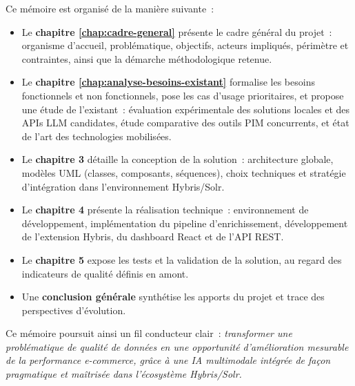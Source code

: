 Ce mémoire est organisé de la manière suivante~:

\begin{itemize}
  \item Le \textbf{chapitre \ref{chap:cadre-general}} présente le cadre général du projet~: organisme d'accueil, problématique, objectifs, acteurs impliqués, périmètre et contraintes, ainsi que la démarche méthodologique retenue.

  \item Le \textbf{chapitre \ref{chap:analyse-besoins-existant}} formalise les besoins fonctionnels et non fonctionnels, pose les cas d'usage prioritaires, et propose une étude de l'existant~: évaluation expérimentale des solutions locales et des APIs LLM candidates, étude comparative des outils PIM concurrents, et état de l'art des technologies mobilisées.

  \item Le \textbf{chapitre 3} détaille la conception de la solution~: architecture globale, modèles UML (classes, composants, séquences), choix techniques et stratégie d'intégration dans l'environnement Hybris/Solr.

  \item Le \textbf{chapitre 4} présente la réalisation technique~: environnement de développement, implémentation du pipeline d'enrichissement, développement de l'extension Hybris, du dashboard React et de l'API REST.

  \item Le \textbf{chapitre 5} expose les tests et la validation de la solution, au regard des indicateurs de qualité définis en amont.

  \item Une \textbf{conclusion générale} synthétise les apports du projet et trace des perspectives d'évolution.
\end{itemize}

Ce mémoire poursuit ainsi un fil conducteur clair~: \textit{transformer une problématique de qualité de données en une opportunité d'amélioration mesurable de la performance e-commerce, grâce à une IA multimodale intégrée de façon pragmatique et maîtrisée dans l'écosystème Hybris/Solr.}